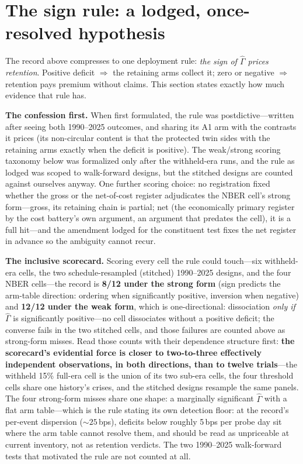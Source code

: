 \documentclass[sigconf,anonymous]{acmart}
\newcommand{\G}{\hat\Gamma}
\begin{document}
\section{The sign rule: a lodged, once-resolved hypothesis}
\label{sec:signrule}

The record above compresses to one deployment rule: \emph{the sign of
$\G$ prices retention}. Positive deficit $\Rightarrow$ the retaining
arms collect it; zero or negative $\Rightarrow$ retention pays premium
without claims. This section states exactly how much evidence that rule
has.

\textbf{The confession first.} When first formulated, the rule was
postdictive---written after seeing both 1990--2025 outcomes, and
sharing its A1 arm with the contrasts it prices (its non-circular
content is that the protected twin sides with the retaining arms
exactly when the deficit is positive). The weak/strong scoring
taxonomy below was formalized only after the withheld-era runs, and
the rule as lodged was scoped to walk-forward designs, but the
stitched designs are counted against ourselves anyway. One further
scoring choice:
no registration fixed whether the gross or the net-of-cost register
adjudicates the NBER cell's strong form---gross, its retaining chain
is partial; net (the economically primary register by the cost
battery's own argument, an argument that predates the cell), it is a
full hit---and the amendment lodged for the constituent test fixes
the net register in advance so the ambiguity cannot recur.

\textbf{The inclusive scorecard.} Scoring every cell the rule could
touch---six withheld-era cells, the two schedule-resampled (stitched)
1990--2025 designs, and the four NBER cells---the record is
\textbf{8/12 under the strong form} (sign predicts the arm-table
direction: ordering when significantly positive, inversion when
negative) and \textbf{12/12 under the weak form}, which is
one-directional: dissociation \emph{only if} $\G$ is significantly
positive---no cell dissociates without a positive deficit; the converse
fails in the two stitched cells, and those failures are counted above
as strong-form misses. Read those counts with their dependence
structure first: \textbf{the scorecard's evidential force is closer to
two-to-three effectively independent observations, in both directions,
than to twelve trials}---the withheld 15\% full-era cell is the
union of its two sub-era cells, the four threshold cells share one
history's crises, and the stitched designs resample the same panels.
The four strong-form misses share one shape: a marginally significant
$\G$ with a flat arm table---which is the rule stating its own
detection floor: at the record's per-event dispersion
(${\sim}25$\,bps), deficits below roughly 5\,bps per probe day sit
where the arm table cannot resolve them, and should be read as
unpriceable at current inventory, not as retention verdicts. The two
1990--2025 walk-forward tests that
motivated the rule are not counted at all.
\end{document}
